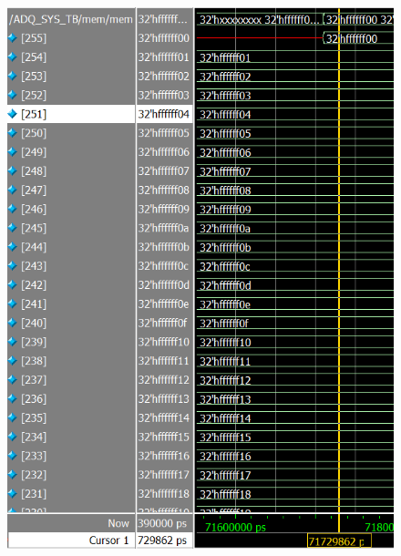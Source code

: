 \documentclass[conference]{IEEEtran}
\begin{document}
	\begin{figure}[H]
		\centering
		\includegraphics[width=\columnwidth]{Files/full_mem_val}
		\caption{}
		\label{fig:fullmemval}
	\end{figure}
	
\end{document}
